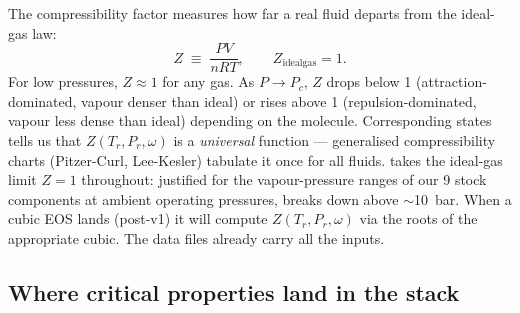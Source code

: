 \documentclass[11pt,a4paper]{article}
\begin{document}
The compressibility factor measures how far a real fluid departs
from the ideal-gas law:
\begin{equation}
   Z \;\equiv\; \frac{P V}{n R T}, \qquad
   Z_{\mathrm{ideal gas}} = 1.
\end{equation}
For low pressures, $Z \approx 1$ for any gas.  As $P \to P_c$,
$Z$ drops below 1 (attraction-dominated, vapour denser than ideal)
or rises above 1 (repulsion-dominated, vapour less dense than
ideal) depending on the molecule.  Corresponding states tells us
that $Z(T_r, P_r, \omega)$ is a \emph{universal} function ---
generalised compressibility charts (Pitzer-Curl, Lee-Kesler) tabulate
it once for all fluids. takes the ideal-gas limit $Z = 1$ throughout: justified for
the vapour-pressure ranges of our 9 stock components at ambient
operating pressures, breaks down above $\sim$10~bar.  When a cubic
EOS lands (post-v1) it will compute $Z(T_r, P_r, \omega)$ via the
roots of the appropriate cubic.  The data files already carry all
the inputs.

\subsection{Where critical properties land in the stack}
\end{document}
